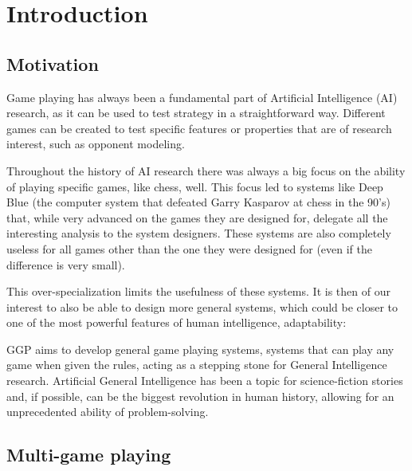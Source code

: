 
\chapter{Introduction}
\label{chapter:introduction}

\section{Motivation}

Game playing has always been a fundamental part of Artificial Intelligence (AI) research, as it can be used to test strategy in a straightforward way. Different games can be created to test specific features or properties that are of research interest, such as opponent modeling.

Throughout the history of AI research there was always a big focus on the ability of playing specific games, like chess, well. This focus led to systems like Deep Blue (the computer system that defeated Garry Kasparov at chess in the 90’s) that, while very advanced on the games they are designed for, delegate all the interesting analysis to the system designers. These systems are also completely useless for all games other than the one they were designed for (even if the difference is very small).

This over-specialization limits the usefulness of these systems. It is then of our interest to also be able to design more general systems, which could be closer to one of the most powerful features of human intelligence, adaptability:


\gls{GGP} aims to develop general game playing systems, systems that can play any game when given the rules, acting as a stepping stone for General Intelligence research. Artificial General Intelligence has been a topic for science-fiction stories and, if possible, can be the biggest revolution in human history, allowing for an unprecedented ability of problem-solving.
 
\section{Multi-game playing} 
 
